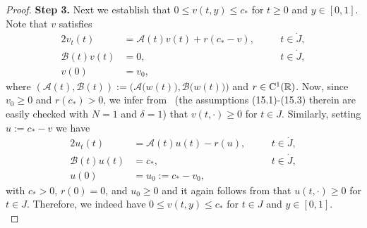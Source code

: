 \documentclass[reqno,11pt]{amsart}
\numberwithin{equation}{section}
\newcommand{\R}{\mathbb{R}}
\begin{document}
\begin{proof}
{\bf Step 3.} Next we establish that $0\le v(t,y)\le c_*$ for $t\ge 0$ and $y\in [0,1]$.  Note that $v$ satisfies
\begin{alignat*}{2}
v_t(t)&= \mathcal{A}(t)v(t)+r(c_*-v), \quad&&t\in \dot J,\\
\mathcal{B}(t) v(t)&=0, && t\in \dot J,\\
 v(0)&=v_0,&&
\end{alignat*}
where $(\mathcal{A}(t),\mathcal{B}(t)):=\bigl(\mathcal{A}\bigl( w(t)
\bigr),\mathcal{B}\bigl( w(t) \bigr)\bigr)$ and $r\in
{\rm C}^1(\R)$. 
Now, since $v_0\geq 0$ and $r(c_*)>0$, we infer
from~\cite[Theorem~15.1]{Amann_Teubner} (the assumptions
(15.1)-(15.3) therein are easily checked with $N=1$ and $\delta=1$)
that $v(t,\cdot)\ge 0$ for $t\in J$. Similarly, setting $u:=c_*-v$ we have
\begin{alignat*}{2}
u_t(t)&= \mathcal{A}(t)u(t)-r(u), \quad &&t\in \dot J,\\
\mathcal{B}(t)u(t)&=c_*, &&t\in \dot J,\\
u(0)&=u_0:=c_*-v_0,&&
\end{alignat*}
with $c_*> 0$, $r(0)=0$, and $u_0\ge 0$ and it again follows from
\cite[Theorem~15.1]{Amann_Teubner}  that $u(t,\cdot)\ge 0$ for $t\in
J$. Therefore, we indeed have $0\le v(t,y)\le c_*$ for $t\in J$ and
$y\in [0,1]$.\\


\end{proof}
\end{document}
